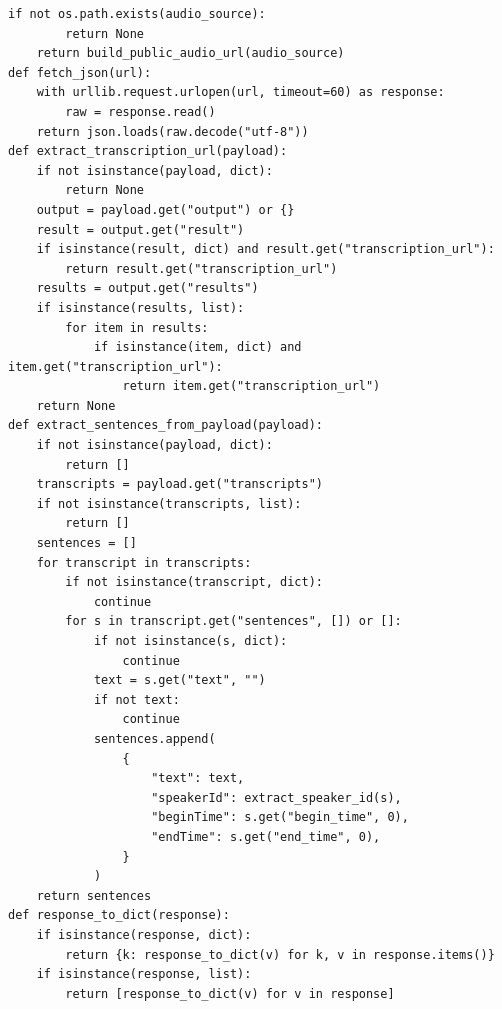 \documentclass[12pt,a4paper]{article}
\begin{document}
\begin{Verbatim}[fontsize=\footnotesize]
    if not os.path.exists(audio_source):
        return None
    return build_public_audio_url(audio_source)
def fetch_json(url):
    with urllib.request.urlopen(url, timeout=60) as response:
        raw = response.read()
    return json.loads(raw.decode("utf-8"))
def extract_transcription_url(payload):
    if not isinstance(payload, dict):
        return None
    output = payload.get("output") or {}
    result = output.get("result")
    if isinstance(result, dict) and result.get("transcription_url"):
        return result.get("transcription_url")
    results = output.get("results")
    if isinstance(results, list):
        for item in results:
            if isinstance(item, dict) and item.get("transcription_url"):
                return item.get("transcription_url")
    return None
def extract_sentences_from_payload(payload):
    if not isinstance(payload, dict):
        return []
    transcripts = payload.get("transcripts")
    if not isinstance(transcripts, list):
        return []
    sentences = []
    for transcript in transcripts:
        if not isinstance(transcript, dict):
            continue
        for s in transcript.get("sentences", []) or []:
            if not isinstance(s, dict):
                continue
            text = s.get("text", "")
            if not text:
                continue
            sentences.append(
                {
                    "text": text,
                    "speakerId": extract_speaker_id(s),
                    "beginTime": s.get("begin_time", 0),
                    "endTime": s.get("end_time", 0),
                }
            )
    return sentences
def response_to_dict(response):
    if isinstance(response, dict):
        return {k: response_to_dict(v) for k, v in response.items()}
    if isinstance(response, list):
        return [response_to_dict(v) for v in response]
\end{Verbatim}
\newpage
{}
\fancyhead[R]{}
\end{document}
